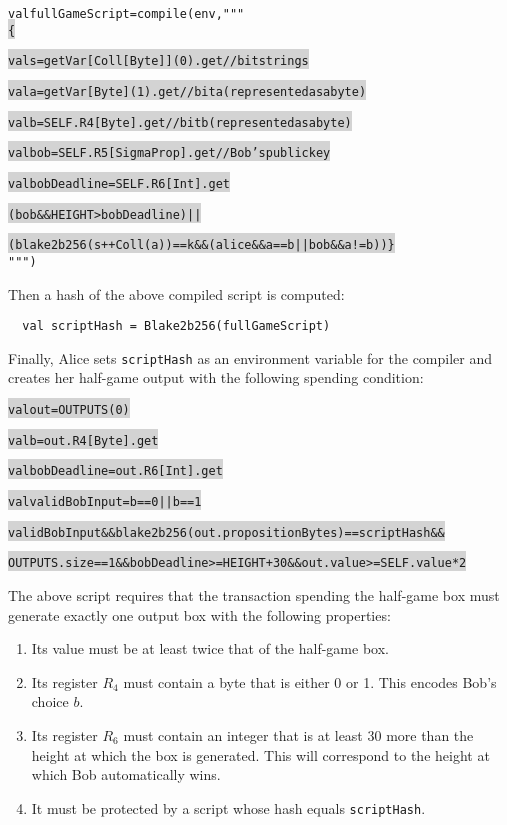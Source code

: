 \documentclass[11pt]{article}
\newcommand\Hi[2][lightgray]{%
	\hspace*{-\fboxsep}%
	\colorbox{#1}{#2}%
	\hspace*{-\fboxsep}%
}
\begin{document}
\begin{alltt}
val fullGameScript = compile(env, """ \Hi{\{}
  \Hi{val s     = getVar[Coll[Byte]](0).get // bit string s}
  \Hi{val a     = getVar[Byte](1).get       // bit a (represented as a byte)}
  \Hi{val b     = SELF.R4[Byte].get         // bit b (represented as a byte)}
  \Hi{val bob   = SELF.R5[SigmaProp].get    // Bob's public key}
  \Hi{val bobDeadline = SELF.R6[Int].get}
   
  \Hi{(bob && HEIGHT > bobDeadline) || }
  \Hi{(blake2b256(s ++ Coll(a)) == k && (alice && a == b || bob && a != b)) \}} """)
\end{alltt}

Then a hash of the above compiled script is computed:

\begin{verbatim}
  val scriptHash = Blake2b256(fullGameScript)
\end{verbatim}

Finally, Alice sets \texttt{scriptHash} as an environment variable for the compiler and creates her half-game output with the following spending condition:

\begin{alltt}
  \Hi{val out           = OUTPUTS(0)}
  \Hi{val b             = out.R4[Byte].get}
  \Hi{val bobDeadline   = out.R6[Int].get}
  \Hi{val validBobInput = b == 0 || b == 1}

  \Hi{validBobInput && blake2b256(out.propositionBytes) == scriptHash &&}
  \Hi{OUTPUTS.size == 1 && bobDeadline >= HEIGHT+30 && out.value >= SELF.value * 2 }
\end{alltt}

The above script requires that the transaction spending the half-game box must generate exactly one output box with the following properties:

\begin{enumerate}
	\item Its value must be at least twice that of the half-game box.
	\item Its register $R_4$ must contain a byte that is either 0 or 1. This encodes Bob's choice $b$.
	\item Its register $R_6$ must contain an integer that is at least 30 more than the height at which the box is generated. This will correspond to the height at which Bob automatically wins.
	\item It must be protected by a script whose hash equals \texttt{scriptHash}.
\end{enumerate}
 
\end{document}
